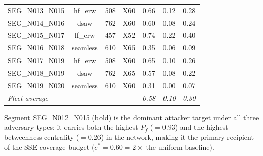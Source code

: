 \begin{table}[htbp]
\begin{tabular}{@{}lcccccc@{}}
    SEG\_N013\_N015 & hf\_erw   & 508 & X60 & 0.66 & 0.12 & 0.28 \\
    SEG\_N014\_N016 & dsaw      & 762 & X60 & 0.60 & 0.08 & 0.24 \\
    SEG\_N015\_N017 & lf\_erw   & 457 & X52 & 0.74 & 0.22 & 0.40 \\
    SEG\_N016\_N018 & seamless  & 610 & X65 & 0.35 & 0.06 & 0.09 \\
    SEG\_N017\_N019 & hf\_erw   & 508 & X60 & 0.65 & 0.10 & 0.26 \\
    SEG\_N018\_N019 & dsaw      & 762 & X65 & 0.57 & 0.08 & 0.22 \\
    SEG\_N019\_N020 & seamless  & 610 & X60 & 0.31 & 0.00 & 0.07 \\
    \midrule
    \textit{Fleet average} & --- & --- & --- & \textit{0.58} & \textit{0.10}
      & \textit{0.30} \\
    \bottomrule
  \end{tabular}
\end{table}

\noindent Segment SEG\_N012\_N015 (bold) is the dominant attacker
target under all three adversary types: it carries both the highest
$P_f$ ($= 0.93$) and the highest betweenness centrality ($= 0.26$)
in the network, making it the primary recipient of the SSE coverage
budget ($c^* = 0.60 = 2\times$ the uniform baseline).
